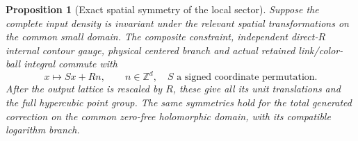 \documentclass[11pt]{article}
\newtheorem{proposition}[theorem]{Proposition}
\theoremstyle{remark}
\begin{document}
\begin{proposition}[Exact spatial symmetry of the local sector]
\label{msy-spatial-proposition}
Suppose the complete input density is invariant under the relevant
spatial transformations on the common small domain. The composite
constraint, independent direct-\(R\) internal contour gauge, physical
centered branch and actual retained link/color-ball integral commute
with
\begin{equation}
 x\longmapsto Sx+Rn,\qquad
 n\in\mathbb Z^d,\quad
 S\text{ a signed coordinate permutation}.
 \label{msy-space-group}
\end{equation}
After the output lattice is rescaled by \(R\), these give all its unit
translations and the full hypercubic point group. The same symmetries
hold for the total generated correction on the common zero-free
holomorphic domain, with its compatible logarithm branch.
\end{proposition}
\end{document}
